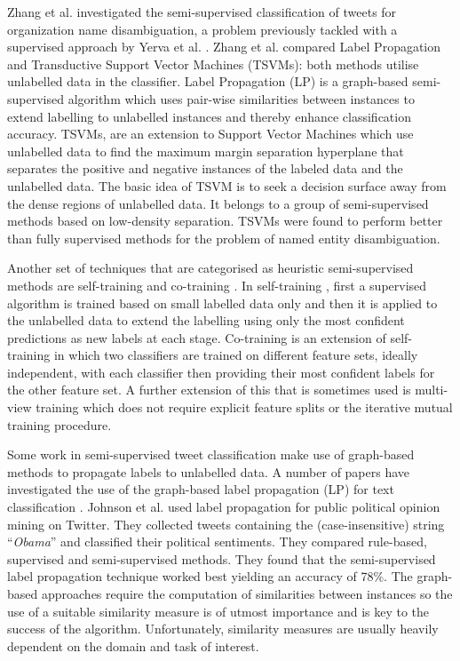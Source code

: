 \documentclass[10pt,letterpaper]{article}
\begin{document}
Zhang et al. \cite{REF67} investigated the semi-supervised classification of tweets for organization name disambiguation, a problem previously tackled with a supervised approach by  Yerva et al. \cite{REF56}. Zhang et al. compared Label Propagation and Transductive Support Vector Machines (TSVMs): both methods utilise unlabelled data in the classifier.  Label Propagation (LP) is a graph-based semi- supervised algorithm which uses pair-wise similarities between instances to extend labelling to unlabelled instances and thereby enhance classification accuracy. TSVMs, are an extension to Support Vector Machines which use unlabelled data to find the maximum margin separation hyperplane that separates the positive and negative instances of the labeled data and the unlabelled data. The basic idea of TSVM is to seek a decision surface away from the dense regions of unlabelled data. It belongs to a group of semi-supervised methods based on low-density separation. TSVMs were found to perform better than fully supervised methods for the problem of named entity disambiguation.    

Another set of techniques that are categorised as heuristic semi-supervised methods are self-training and co-training \cite{REF81}. In self-training \cite{REF82}, first a supervised algorithm is trained based on small labelled data only and then it is applied to the unlabelled data to extend the labelling using only the most confident predictions as new labels at each stage. Co-training \cite{REF83} is an extension of self-training in which two classifiers are trained on different feature sets, ideally independent, with each classifier then providing their most confident labels for the other feature set. A further extension of this that is sometimes used is multi-view training which does not require explicit feature splits or the iterative mutual training procedure.  

Some work in semi-supervised tweet classification make use of graph-based methods to propagate labels to unlabelled data.  A number of papers have investigated the use of the graph-based label propagation (LP) for text classification \cite{REF74,REF73}. Johnson et al.  \cite{REF75} used label propagation for public political opinion mining on Twitter. They collected tweets containing the (case-insensitive) string ``\textit{Obama}'' and classified their political sentiments. They compared rule-based, supervised and semi-supervised methods. They found that the semi-supervised label propagation technique worked best yielding an accuracy of 78\%. The graph-based approaches require the computation of similarities between instances so the use of a suitable similarity measure is of utmost importance and is key to the success of the algorithm. Unfortunately, similarity measures are usually heavily dependent on the domain and task of interest. 
\end{document}
